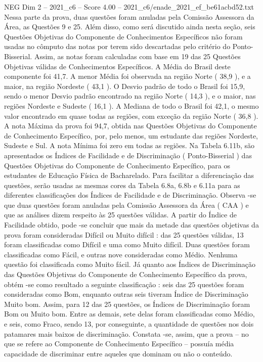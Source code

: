 \begin{textsample}{NEG Dim 2 – 2021\_c6 – Score 4.00 – 2021\_c6/enade\_2021\_ef\_be61acbd52.txt}
Nessa parte da prova, duas questões foram anuladas pela Comissão Assessora da Área, as Questões 9 e 25.
Além disso, como será discutido ainda nesta seção, seis Questões Objetivas do Componente de Conhecimentos Específicos não foram usadas no cômputo das notas por terem sido descartadas pelo critério do Ponto-Bisserial.
Assim, as notas foram calculadas com base em 19 das 25 Questões Objetivas válidas de Conhecimentos Específicos.
A Média do Brasil deste componente foi 41,7.
A menor Média foi observada na região Norte ( 38,9 ), e a maior, na região Nordeste ( 43,1 ).
O Desvio padrão de todo o Brasil foi 15,9, sendo o menor Desvio padrão encontrado na região Norte ( 14,3 ), e o maior, nas regiões Nordeste e Sudeste ( 16,1 ).
A Mediana de todo o Brasil foi 42,1, o mesmo valor encontrado em quase todas as regiões, com exceção da região Norte ( 36,8 ).
A nota Máxima da prova foi 94,7, obtida nas Questões Objetivas do Componente de Conhecimento Específico, por, pelo menos, um estudante das regiões Nordeste, Sudeste e Sul.
A nota Mínima foi zero em todas as regiões.
Na Tabela 6.11b, são apresentados os Índices de Facilidade e de Discriminação ( Ponto-Bisserial ) das Questões Objetivas do Componente de Conhecimento Específico, para os estudantes de Educação Física de Bacharelado.
Para facilitar a diferenciação das questões, serão usadas as mesmas cores da Tabela 6.8a, 6.8b e 6.11a para as diferentes classificações dos Índices de Facilidade e de Discriminação.
Observa -se que duas questões foram anuladas pela Comissão Assessora da Área ( CAA ) e que as análises dizem respeito às 25 questões válidas.
A partir do Índice de Facilidade obtido, pode -se concluir que mais da metade das questões objetivas da prova foram consideradas Difícil ou Muito difícil : das 25 questões válidas, 13 foram classificadas como Difícil e uma como Muito difícil.
Duas questões foram classificadas como Fácil, e outras nove consideradas como Médio.
Nenhuma questão foi classificada como Muito fácil.
Já quanto aos Índices de Discriminação das Questões Objetivas do Componente de Conhecimento Específico da prova, obtém -se como resultado a seguinte classificação : seis das 25 questões foram consideradas como Bom, enquanto outras seis tiveram Índice de Discriminação Muito bom.
Assim, para 12 das 25 questões, os Índices de Discriminação foram Bom ou Muito bom.
Entre as demais, sete delas foram classificadas como Médio, e seis, como Fraco, sendo 13, por conseguinte, a quantidade de questões nos dois patamares mais baixos de discriminação.
Constata -se, assim, que a prova – no que se refere ao Componente de Conhecimento Específico – possuía média capacidade de discriminar entre aqueles que dominam ou não o conteúdo.

\end{textsample}
